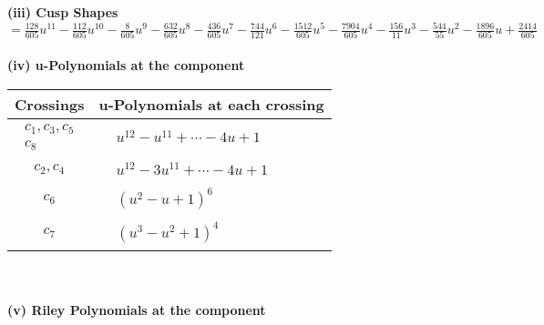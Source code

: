 \documentclass[1p]{elsarticle_modified}
\theoremstyle{definition}
\begin{document}
\flushleft \textbf{(iii) Cusp Shapes $= \frac{128}{605} u^{11}-\frac{112}{605} u^{10}-\frac{8}{605} u^9-\frac{632}{605} u^8-\frac{436}{605} u^7-\frac{744}{121} u^6-\frac{1512}{605} u^5-\frac{7904}{605} u^4-\frac{156}{11} u^3-\frac{544}{55} u^2-\frac{1896}{605} u+\frac{2414}{605}$}\\~\\
\newpage\renewcommand{\arraystretch}{1}
\flushleft \textbf{(iv) u-Polynomials at the component}\newline \\
\begin{tabular}{m{50pt}|m{274pt}}
Crossings & \hspace{64pt}u-Polynomials at each crossing \\
\hline $$\begin{aligned}c_{1},c_{3},c_{5}\\c_{8}\end{aligned}$$&$\begin{aligned}
&u^{12}- u^{11}+\cdots-4 u+1
\end{aligned}$\\
\hline $$\begin{aligned}c_{2},c_{4}\end{aligned}$$&$\begin{aligned}
&u^{12}-3 u^{11}+\cdots-4 u+1
\end{aligned}$\\
\hline $$\begin{aligned}c_{6}\end{aligned}$$&$\begin{aligned}
&(u^2- u+1)^6
\end{aligned}$\\
\hline $$\begin{aligned}c_{7}\end{aligned}$$&$\begin{aligned}
&(u^3- u^2+1)^4
\end{aligned}$\\
\hline
\end{tabular}\\~\\
\newpage\renewcommand{\arraystretch}{1}
\flushleft \textbf{(v) Riley Polynomials at the component}\newline \\
\end{document}

